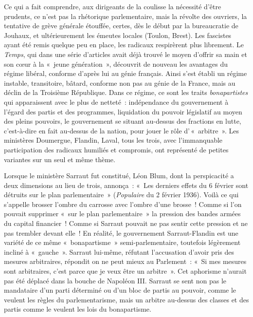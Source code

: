\documentclass[french,twoside]{book} %
\begin{document}
Ce qui a fait comprendre, aux dirigeants de la coulisse la nécessité d’être prudents, ce n’est pas la rhétorique parlementaire, mais la révolte des ouvriers, la tentative de grève générale étouffée, certes, dès le début par la bureaucratie de Jouhaux, et ultérieurement les émeutes locales (Toulon, Brest). Les fascistes ayant été remis quelque  peu en place, les radicaux respirèrent plus librement. Le \emph{Temps}, qui dans une série d’articles avait déjà trouvé le moyen d’offrir sa main et son cœur à la « jeune génération », découvrit de nouveau les avantages du régime libéral, conforme d’après lui au génie français. Ainsi s’est établi un régime instable, transitoire, bâtard, conforme non pas au génie de la France, mais au déclin de la Troisième République. Dans ce régime, ce sont les traits \emph{bonapartistes} qui apparaissent avec le plus de netteté : indépendance du gouvernement à l’égard des partis et des programmes, liquidation du pouvoir législatif au moyen des pleins pouvoirs, le gouvernement se situant au-dessus des fractions en lutte, c’est-à-dire en fait au-dessus de la nation, pour jouer le rôle d’ « arbitre ». Les ministères Doumergue, Flandin, Laval, tous les trois, avec l’immanquable participation des radicaux humiliés et compromis, ont représenté de petites variantes sur un seul et même thème.\par
Lorsque le ministère Sarraut fut constitué, Léon Blum, dont la perspicacité a deux dimensions au lieu de trois, annonça : « Les derniers effets du 6 février sont détruits sur le plan parlementaire » (\emph{Populaire} du 2 février 1936). Voilà ce qui s’appelle brosser l’ombre du carrosse avec l’ombre d’une brosse ! Comme si l’on pouvait supprimer « sur le plan parlementaire » la pression des bandes armées du capital financier ! Comme si Sarraut pouvait ne pas sentir cette pression et ne pas trembler devant elle ! En réalité, le gouvernement Sarraut-Flandin est une variété de ce même « bonapartisme » semi-parlementaire, toutefois légèrement incliné à « gauche ». Sarraut lui-même, réfutant l’accusation d’avoir pris des mesures arbitraires, répondit on ne peut mieux au Parlement : « Si mes mesures sont arbitraires, c’est parce que je veux être un arbitre ». Cet aphorisme n’aurait pas été déplacé dans la bouche de Napoléon III. Sarraut se sent non pas le  mandataire d’un parti déterminé ou d’un bloc de partis au pouvoir, comme le veulent les règles du parlementarisme, mais un arbitre au-dessus des classes et des partis comme le veulent les lois du bonapartisme.\par
\end{document}
